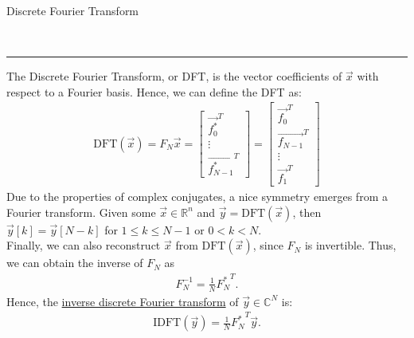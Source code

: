 \documentclass{article}
\newcommand{\header}[1]{\begin{large}\noindent #1\end{large}\\\rule{\textwidth}{0.5pt}}
\newcommand{\gap}{\medskip\\}
\begin{document}
\pagebreak

\header{Discrete Fourier Transform}
The Discrete Fourier Transform, or DFT, is the vector coefficients of $\vec{x}$ 
with respect to a Fourier basis. Hence, we can define the DFT as:
\begin{align*}
    \textrm{DFT}(\vec{x}) = F_N \vec{x} = \begin{bmatrix}
        \vec{f^*_0}^T \\
        \vdots \\
        \vec{f^*_{N-1}}^T
    \end{bmatrix} 
    = 
    \begin{bmatrix}
        \vec{f_0}^T\\
        \vec{f_{N-1}}^T\\
        \vdots \\
        \vec{f_1}^T
    \end{bmatrix}
\end{align*}
Due to the properties of complex conjugates, a nice symmetry emerges from a Fourier transform.
Given some $\vec{x} \in \mathbb{R}^n$ and $\vec{y} = \textrm{DFT}(\vec{x})$, then 
$\vec{y}[k] = \vec{y}[N - k]$ for $1 \leq k \leq N - 1$ or $0 < k < N$.
\gap
Finally, we can also reconstruct $\vec{x}$ from $\textrm{DFT}(\vec{x})$, since $F_N$ 
is invertible. Thus, we can obtain the inverse of $F_N$ as 
\begin{align*}
    F_N^{-1} = \frac{1}{N}{F_N^*}^T.
\end{align*}
Hence, the \underline{inverse discrete Fourier transform} of $\vec{y} \in \mathbb{C}^N$
is:
\begin{align*}
    \textrm{IDFT}(\vec{y}) = \frac{1}{N}{F_N^*}^T \vec{y}.
\end{align*}
\end{document}

